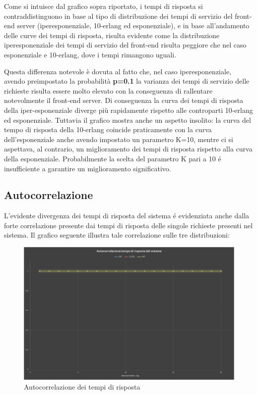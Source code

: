 Come si intuisce dal grafico sopra riportato, i tempi di risposta si contraddistinguono in base
al tipo di distribuzione dei tempi di servizio del front-end server (iperesponenziale, 10-erlang 
ed esponenziale), e in base all’andamento delle curve dei tempi di risposta, risulta evidente 
come la distribuzione iperesponenziale dei tempi di servizio del front-end risulta peggiore 
che nel caso esponenziale e 10-erlang, dove i tempi rimangono uguali.

Questa differenza notevole \`e dovuta al fatto che, nel caso iperesponenziale, avendo 
preimpostato la probabilità \textbf{p=0.1} la varianza dei tempi di servizio delle richieste risulta 
essere molto elevato con la conseguenza di rallentare notevolmente il front-end server.
Di conseguenza la curva dei tempi di risposta della iper-esponenziale diverge pi\`u 
rapidamente rispetto alle controparti 10-erlang ed esponenziale. Tuttavia il grafico mostra 
anche un aspetto insolito: la curva del tempo di risposta della 10-erlang coincide 
praticamente con la curva dell’esponenziale anche avendo impostato un parametro K=10, 
mentre ci si aspettava, al contrario, un miglioramento dei tempi di risposta rispetto alla curva 
della esponenziale. Probabilmente la scelta del parametro K pari a 10 \'e insufficiente a 
garantire un miglioramento significativo.

\subsection{Autocorrelazione}

L’evidente divergenza dei tempi di risposta del sistema \'e evidenziata anche dalla forte 
correlazione presente dai tempi di risposta delle singole richieste presenti nel sistema. Il 
grafico seguente illustra tale correlazione sulle tre distribuzioni:

\begin{figure}[H]
 \centering
 \includegraphics[scale=0.45]{img/autocorrelation.png}
 \caption[Autocorrelazione dei tempi di risposta]{Autocorrelazione dei tempi di risposta}
 \label{fig:Autocorrelazione dei tempi di risposta}
\end{figure}

